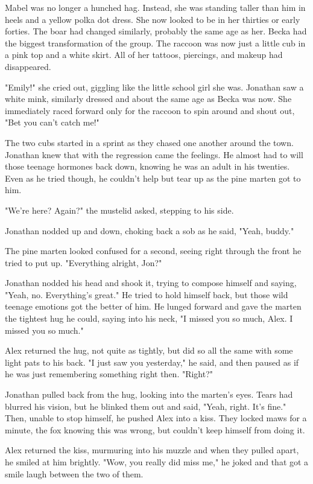 Mabel was no longer a hunched hag. Instead, she was standing taller than him in heels and a yellow polka dot dress. She now looked to be in her thirties or early forties. The boar had changed similarly, probably the same age as her. Becka had the biggest transformation of the group. The raccoon was now just a little cub in a pink top and a white skirt. All of her tattoos, piercings, and makeup had disappeared.

"Emily!" she cried out, giggling like the little school girl she was. Jonathan saw a white mink, similarly dressed and about the same age as Becka was now. She immediately raced forward only for the raccoon to spin around and shout out, "Bet you can't catch me!"

The two cubs started in a sprint as they chased one another around the town. Jonathan knew that with the regression came the feelings. He almost had to will those teenage hormones back down, knowing he was an adult in his twenties. Even as he tried though, he couldn't help but tear up as the pine marten got to him.

"We're here? Again?" the mustelid asked, stepping to his side.

Jonathan nodded up and down, choking back a sob as he said, "Yeah, buddy."

The pine marten looked confused for a second, seeing right through the front he tried to put up. "Everything alright, Jon?"

Jonathan nodded his head and shook it, trying to compose himself and saying, "Yeah, no. Everything's great." He tried to hold himself back, but those wild teenage emotions got the better of him. He lunged forward and gave the marten the tightest hug he could, saying into his neck, "I missed you so much, Alex. I missed you so much."

Alex returned the hug, not quite as tightly, but did so all the same with some light pats to his back. "I just saw you yesterday," he said, and then paused as if he was just remembering something right then. "Right?"

Jonathan pulled back from the hug, looking into the marten's eyes. Tears had blurred his vision, but he blinked them out and said, "Yeah, right. It's fine." Then, unable to stop himself, he pushed Alex into a kiss. They locked maws for a minute, the fox knowing this was wrong, but couldn't keep himself from doing it.

Alex returned the kiss, murmuring into his muzzle and when they pulled apart, he smiled at him brightly. "Wow, you really did miss me," he joked and that got a smile laugh between the two of them.

